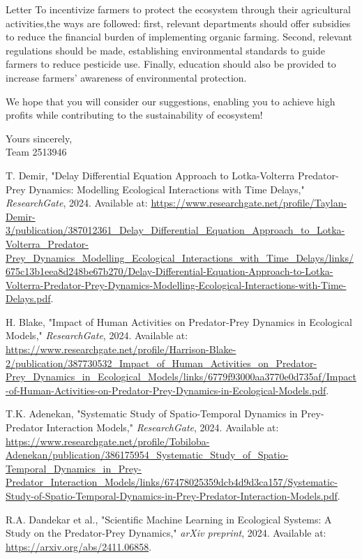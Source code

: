 \documentclass[12pt]{article}  %
\begin{document}
\begin{letter}{Letter}
To incentivize farmers to protect the ecosystem through their agricultural activities,the ways are followed: first, relevant departments should offer subsidies to reduce the financial burden of implementing organic farming. Second, relevant regulations should be made, establishing environmental standards to guide farmers to reduce pesticide use. Finally, education should also be provided to increase farmers’ awareness of environmental protection.

We hope that you will consider our suggestions, enabling you to achieve high profits while contributing to the sustainability of ecosystem!

\begin{flushright}
    Yours sincerely,\\
    Team 2513946
\end{flushright}
\end{letter}

\newpage
\begin{thebibliography}{99}
    T. Demir, "Delay Differential Equation Approach to Lotka-Volterra Predator-Prey Dynamics: Modelling Ecological Interactions with Time Delays," \textit{ResearchGate}, 2024. Available at: \url{https://www.researchgate.net/profile/Taylan-Demir-3/publication/387012361_Delay_Differential_Equation_Approach_to_Lotka-Volterra_Predator-Prey_Dynamics_Modelling_Ecological_Interactions_with_Time_Delays/links/675c13b1eea8d248be67b270/Delay-Differential-Equation-Approach-to-Lotka-Volterra-Predator-Prey-Dynamics-Modelling-Ecological-Interactions-with-Time-Delays.pdf}.
    
    H. Blake, "Impact of Human Activities on Predator-Prey Dynamics in Ecological Models," \textit{ResearchGate}, 2024. Available at: \url{https://www.researchgate.net/profile/Harrison-Blake-2/publication/387730532_Impact_of_Human_Activities_on_Predator-Prey_Dynamics_in_Ecological_Models/links/6779f93000aa3770e0d735af/Impact-of-Human-Activities-on-Predator-Prey-Dynamics-in-Ecological-Models.pdf}.
    
    T.K. Adenekan, "Systematic Study of Spatio-Temporal Dynamics in Prey-Predator Interaction Models," \textit{ResearchGate}, 2024. Available at: \url{https://www.researchgate.net/profile/Tobiloba-Adenekan/publication/386175954_Systematic_Study_of_Spatio-Temporal_Dynamics_in_Prey-Predator_Interaction_Models/links/67478025359dcb4d9d3ca157/Systematic-Study-of-Spatio-Temporal-Dynamics-in-Prey-Predator-Interaction-Models.pdf}.
    
    R.A. Dandekar et al., "Scientific Machine Learning in Ecological Systems: A Study on the Predator-Prey Dynamics," \textit{arXiv preprint}, 2024. Available at: \url{https://arxiv.org/abs/2411.06858}.
    
\end{thebibliography}
\end{document}
